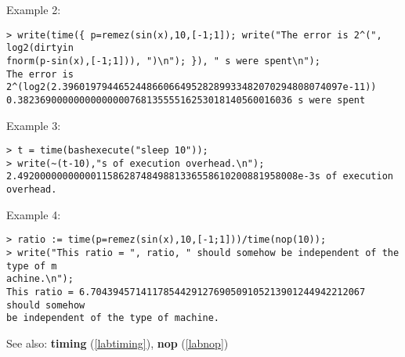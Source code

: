 \noindent Example 2: 
\begin{center}\begin{minipage}{15cm}\begin{Verbatim}[frame=single]
> write(time({ p=remez(sin(x),10,[-1;1]); write("The error is 2^(", log2(dirtyin
fnorm(p-sin(x),[-1;1])), ")\n"); }), " s were spent\n");
The error is 2^(log2(2.39601979446524486606649528289933482070294808074097e-11))
0.3823690000000000000076813555516253018140560016036 s were spent
\end{Verbatim}
\end{minipage}\end{center}
\noindent Example 3: 
\begin{center}\begin{minipage}{15cm}\begin{Verbatim}[frame=single]
> t = time(bashexecute("sleep 10"));
> write(~(t-10),"s of execution overhead.\n");
2.49200000000000115862874849881336558610200881958008e-3s of execution overhead.
\end{Verbatim}
\end{minipage}\end{center}
\noindent Example 4: 
\begin{center}\begin{minipage}{15cm}\begin{Verbatim}[frame=single]
> ratio := time(p=remez(sin(x),10,[-1;1]))/time(nop(10));
> write("This ratio = ", ratio, " should somehow be independent of the type of m
achine.\n");
This ratio = 6.7043945714117854429127690509105213901244942212067 should somehow 
be independent of the type of machine.
\end{Verbatim}
\end{minipage}\end{center}
See also: \textbf{timing} (\ref{labtiming}), \textbf{nop} (\ref{labnop})

